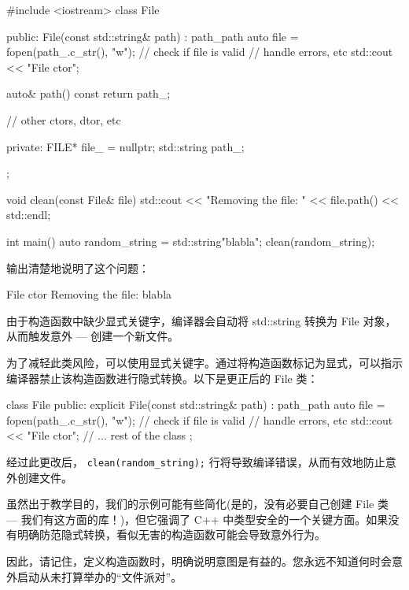 \begin{cpp}
#include <iostream>
class File {
public:
    File(const std::string& path) : path_{path} {
        auto file = fopen(path_.c_str(), "w");
        // check if file is valid
        // handle errors, etc
        std::cout << "File ctor\n";
    }

    auto& path() const {
        return path_;
    }

    // other ctors, dtor, etc

private:
    FILE* file_ = nullptr;
    std::string path_;
};

void clean(const File& file) {
    std::cout << "Removing the file: " << file.path() << std::endl;
}

int main() {
    auto random_string = std::string{"blabla"};
    clean(random_string);
}
\end{cpp}

输出清楚地说明了这个问题：

\begin{shell}
File ctor
Removing the file: blabla
\end{shell}

由于构造函数中缺少显式关键字，编译器会自动将 std::string 转换为 File 对象，从而触发意外 --- 创建一个新文件。


为了减轻此类风险，可以使用显式关键字。通过将构造函数标记为显式，可以指示编译器禁止该构造函数进行隐式转换。以下是更正后的 File 类：

\begin{cpp}
class File {
    public:
    explicit File(const std::string& path) : path_{path} {
        auto file = fopen(path_.c_str(), "w");
        // check if file is valid
        // handle errors, etc
        std::cout << "File ctor\n";
    }
    // ... rest of the class
};
\end{cpp}

经过此更改后， \verb|clean(random_string);| 行将导致编译错误，从而有效地防止意外创建文件。


虽然出于教学目的，我们的示例可能有些简化(是的，没有必要自己创建 File 类 --- 我们有这方面的库！)，但它强调了 C++ 中类型安全的一个关键方面。如果没有明确防范隐式转换，看似无害的构造函数可能会导致意外行为。

因此，请记住，定义构造函数时，明确说明意图是有益的。您永远不知道何时会意外启动从未打算举办的“文件派对”。















